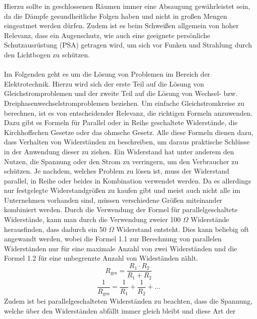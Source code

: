 Hierzu sollte in geschlossenen Räumen immer eine Absaugung gewährleistet sein, da die Dämpfe gesundheitliche Folgen haben und nicht in großen Mengen 
eingeatmet werden dürfen. Zudem ist es beim Schweißen allgemein von hoher Relevanz, dass ein Augenschutz, wie auch eine geeignete persönliche 
Schutzausrüstung (PSA) getragen wird, um sich vor Funken und Strahlung durch den Lichtbogen zu schützen. \autocite{Spath.2023}\\\\ 
Im Folgenden geht es um die Lösung von Problemen im Bereich der Elektrotechnik. Hierzu wird sich der erste Teil auf die Lösung von Gleichstromproblemen und der 
zweite Teil auf die Lösung von Wechsel- bzw. Dreiphasenwechselstromproblemen beziehen. Um einfache Gleichstromkreise zu berechnen, ist es von entscheidender Relevanz, 
die richtigen Formeln anzuwenden. Dazu gibt es \zB Formeln für Parallel oder in Reihe geschaltete Widerstände, die Kirchhoffschen Gesetze oder das ohmsche 
Gesetz. Alle diese Formeln dienen dazu, dass Verhalten von Widerständen zu beschreiben, um daraus praktische Schlüsse in der Anwendung dieser zu ziehen. 
Ein Widerstand hat unter anderem den Nutzen, die Spannung oder den Strom zu verringern, um den Verbraucher zu schützen. Je nachdem, welches Problem zu 
lösen ist, muss der Widerstand parallel, in Reihe oder beides in Kombination verwendet werden. Da es allerdings nur festgelegte Widerstandgrößen zu kaufen 
gibt und meist auch nicht alle im Unternehmen vorhanden sind, müssen verschiedene Größen miteinander kombiniert werden. Durch die Verwendung der Formel für 
parallelgeschaltete Widerstände, kann man \zB durch die Verwendung zweier 100 $\Omega$ Widerstände herausfinden, dass dadurch ein 50 $\Omega$ Widerstand 
entsteht. 
Dies kann beliebig oft angewandt werden, wobei die Formel 1.1 zur Berechnung von parallelen Widerständen nur für eine maximale Anzahl von zwei 
Widerständen und die Formel 1.2 für eine unbegrenzte Anzahl von Wideständen zählt.
\begin{equation}
R_{\text{ges}}=\frac{R_1 \cdot R_2}{R_1+R_2}
\label{eqn:Parallelschaltung von 2 Widerständen}
\end{equation}
\begin{equation}
\frac{1}{R_{\text{ges}}}=\frac{1}{R_1}+\frac{1}{R_2}+\dots
\label{eqn:Parallelschaltung von mehreren Widerständen}
\end{equation}
Zudem ist bei parallelgeschalteten Widerständen zu beachten, dass die Spannung, welche über den Widerständen abfällt immer gleich bleibt und diese Art der 

